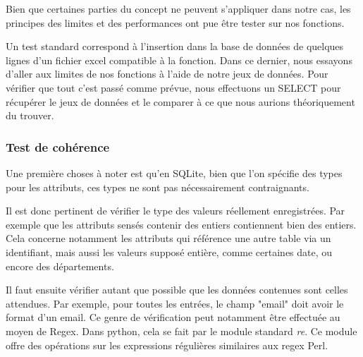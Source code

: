 Bien que certaines parties du concept ne peuvent s'appliquer dans notre cas, les principes des limites et des performances ont pue être tester sur nos fonctions.

Un test standard correspond à l'insertion dans la base de données de quelques lignes d'un fichier excel compatible à la fonction. Dans ce dernier, nous essayons d'aller aux limites de nos fonctions à l'aide de notre jeux de données.
Pour vérifier que tout c'est passé comme prévue, nous effectuons un SELECT pour récupérer le jeux de données et le comparer à ce que nous aurions théoriquement du trouver.

\subsubsection{Test de cohérence}
Une première choses à noter est qu'en SQLite, bien que l'on spécifie des types pour les attributs, ces types ne sont pas nécessairement contraignants. \cite{sqlite}


Il est donc pertinent de vérifier le type des valeurs réellement enregistrées.
Par exemple que les attributs sensés contenir des entiers contiennent bien des entiers.
Cela concerne notamment les attributs qui référence une autre table via un identifiant, mais aussi les valeurs supposé entière, comme certaines date, ou encore des départements.


Il faut ensuite vérifier autant que possible que les données contenues sont celles attendues.
Par exemple, pour toutes les entrées, le champ "email" doit avoir le format d'un email.
Ce genre de vérification peut notamment être effectuée au moyen de Regex.
Dans python, cela se fait par le module standard \textit{re}.
Ce module offre des opérations sur les expressions régulières similaires aux regex Perl.\cite{module_re}